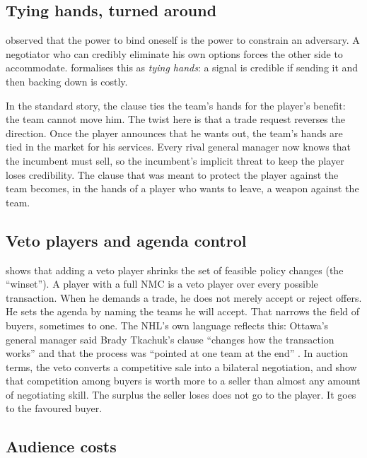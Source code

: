 \subsection{Tying hands, turned around}

\citet{schelling1960} observed that the power to bind oneself is the power to constrain an adversary. A negotiator who can credibly eliminate his own options forces the other side to accommodate. \citet{fearon1997} formalises this as \emph{tying hands}: a signal is credible if sending it and then backing down is costly.

In the standard story, the clause ties the team's hands for the player's benefit: the team cannot move him. The twist here is that a trade request reverses the direction. Once the player announces that he wants out, the team's hands are tied in the market for his services. Every rival general manager now knows that the incumbent must sell, so the incumbent's implicit threat to keep the player loses credibility. The clause that was meant to protect the player against the team becomes, in the hands of a player who wants to leave, a weapon against the team.

\subsection{Veto players and agenda control}

\citet{tsebelis2002} shows that adding a veto player shrinks the set of feasible policy changes (the ``winset''). A player with a full NMC is a veto player over every possible transaction. When he demands a trade, he does not merely accept or reject offers. He sets the agenda by naming the teams he will accept. That narrows the field of buyers, sometimes to one. The NHL's own language reflects this: Ottawa's general manager said Brady Tkachuk's clause ``changes how the transaction works'' and that the process was ``pointed at one team at the end'' \citep{cp24_tkachuk}. In auction terms, the veto converts a competitive sale into a bilateral negotiation, and \citet{bulowklemperer1996} show that competition among buyers is worth more to a seller than almost any amount of negotiating skill. The surplus the seller loses does not go to the player. It goes to the favoured buyer.

\subsection{Audience costs}

